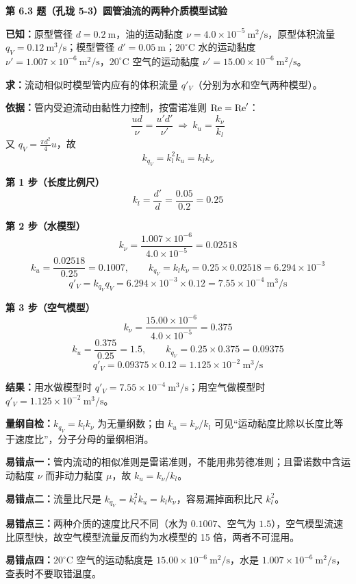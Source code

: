 \noindent\textbf{第 6.3 题（孔珑 5-3）\quad 圆管油流的两种介质模型试验}

\begin{jie}
\textbf{已知：}原型管径 $d=0.2\ \mathrm{m}$，油的运动黏度 $\nu=4.0\times10^{-5}\ \mathrm{m^2/s}$，原型体积流量 $q_V=0.12\ \mathrm{m^3/s}$；模型管径 $d'=0.05\ \mathrm{m}$；$20^{\circ}\mathrm{C}$ 水的运动黏度 $\nu'=1.007\times10^{-6}\ \mathrm{m^2/s}$，$20^{\circ}\mathrm{C}$ 空气的运动黏度 $\nu'=15.00\times10^{-6}\ \mathrm{m^2/s}$。

\textbf{求：}流动相似时模型管内应有的体积流量 $q'_V$（分别为水和空气两种模型）。

\textbf{依据：}管内受迫流动由黏性力控制，按雷诺准则 $\mathrm{Re}=\mathrm{Re}'$：
\[\frac{ud}{\nu}=\frac{u'd'}{\nu'}\ \Longrightarrow\ k_u=\frac{k_\nu}{k_l}\]
又 $q_V=\frac{\pi d^{2}}{4}u$，故
\[k_{q_V}=k_l^{2}k_u=k_l k_\nu\]

\textbf{第 1 步（长度比例尺）}\quad
\[k_l=\frac{d'}{d}=\frac{0.05}{0.2}=0.25\]

\textbf{第 2 步（水模型）}\quad
\[k_\nu=\frac{1.007\times10^{-6}}{4.0\times10^{-5}}=0.02518\]
\[k_u=\frac{0.02518}{0.25}=0.1007,\qquad k_{q_V}=k_l k_\nu=0.25\times0.02518=6.294\times10^{-3}\]
\[q'_V=k_{q_V}q_V=6.294\times10^{-3}\times0.12=7.55\times10^{-4}\ \mathrm{m^3/s}\]

\textbf{第 3 步（空气模型）}\quad
\[k_\nu=\frac{15.00\times10^{-6}}{4.0\times10^{-5}}=0.375\]
\[k_u=\frac{0.375}{0.25}=1.5,\qquad k_{q_V}=0.25\times0.375=0.09375\]
\[q'_V=0.09375\times0.12=1.125\times10^{-2}\ \mathrm{m^3/s}\]

\textbf{结果：}用水做模型时 $q'_V=7.55\times10^{-4}\ \mathrm{m^3/s}$；用空气做模型时 $q'_V=1.125\times10^{-2}\ \mathrm{m^3/s}$。

\textbf{量纲自检：}$k_{q_V}=k_lk_\nu$ 为无量纲数；由 $k_u=k_\nu/k_l$ 可见“运动黏度比除以长度比等于速度比”，分子分母的量纲相消。
\end{jie}

\begin{yicuo}
\textbf{易错点一：}管内流动的相似准则是雷诺准则，不能用弗劳德准则；且雷诺数中含运动黏度 $\nu$ 而非动力黏度 $\mu$，故 $k_u=k_\nu/k_l$。

\textbf{易错点二：}流量比尺是 $k_{q_V}=k_l^{2}k_u=k_lk_\nu$，容易漏掉面积比尺 $k_l^{2}$。

\textbf{易错点三：}两种介质的速度比尺不同（水为 $0.1007$、空气为 $1.5$），空气模型流速比原型快，故空气模型流量反而约为水模型的 15 倍，两者不可混用。

\textbf{易错点四：}$20^{\circ}\mathrm{C}$ 空气的运动黏度是 $15.00\times10^{-6}\ \mathrm{m^2/s}$，水是 $1.007\times10^{-6}\ \mathrm{m^2/s}$，查表时不要取错温度。
\end{yicuo}

